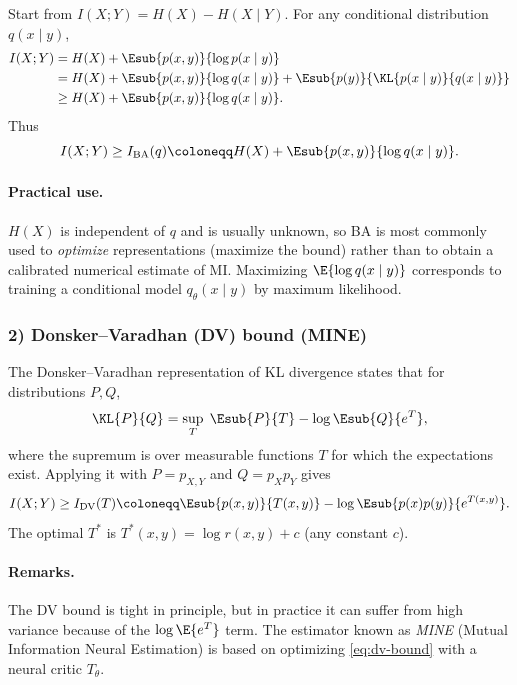 Start from
\(I(X;Y)=H(X)-H(X\mid Y)\).
For any conditional distribution $q(x\mid y)$,
\begin{equation}
\label{eq:ba-bound}
\begin{aligned}
I(X;Y)
&= H(X) + \Esub{p(x,y)}{\log p(x\mid y)}\\
&= H(X) + \Esub{p(x,y)}{\log q(x\mid y)} + \Esub{p(y)}{\KL{p(x\mid y)}{q(x\mid y)}}\\
&\ge H(X) + \Esub{p(x,y)}{\log q(x\mid y)}.
\end{aligned}
\end{equation}
Thus
\begin{equation}
    I(X;Y) \ge I_{\mathrm{BA}}(q) \coloneqq H(X) + \Esub{p(x,y)}{\log q(x\mid y)}.
\end{equation}

\paragraph{Practical use.}
$H(X)$ is independent of $q$ and is usually unknown, so BA is most commonly used to \emph{optimize} representations (maximize the bound) rather than to obtain a calibrated numerical estimate of MI.
Maximizing $\E{\log q(x\mid y)}$ corresponds to training a conditional model $q_\theta(x\mid y)$ by maximum likelihood.

\subsubsection*{2) Donsker--Varadhan (DV) bound (MINE)}

The Donsker--Varadhan representation of KL divergence states that for distributions $P,Q$,
\begin{equation}
    \KL{P}{Q} = \sup_{T}\; \Esub{P}{T} - \log \Esub{Q}{e^{T}},
\end{equation}
where the supremum is over measurable functions $T$ for which the expectations exist.
Applying it with $P=p_{X,Y}$ and $Q=p_Xp_Y$ gives
\begin{equation}
\label{eq:dv-bound}
    I(X;Y) \ge I_{\mathrm{DV}}(T)
    \coloneqq \Esub{p(x,y)}{T(x,y)} - \log \Esub{p(x)p(y)}{e^{T(x,y)}}.
\end{equation}
The optimal $T^*$ is $T^*(x,y)=\log r(x,y)+c$ (any constant $c$).

\paragraph{Remarks.}
The DV bound is tight in principle, but in practice it can suffer from high variance because of the $\log\E{e^{T}}$ term.
The estimator known as \emph{MINE} (Mutual Information Neural Estimation) is based on optimizing \eqref{eq:dv-bound} with a neural critic $T_\theta$.

